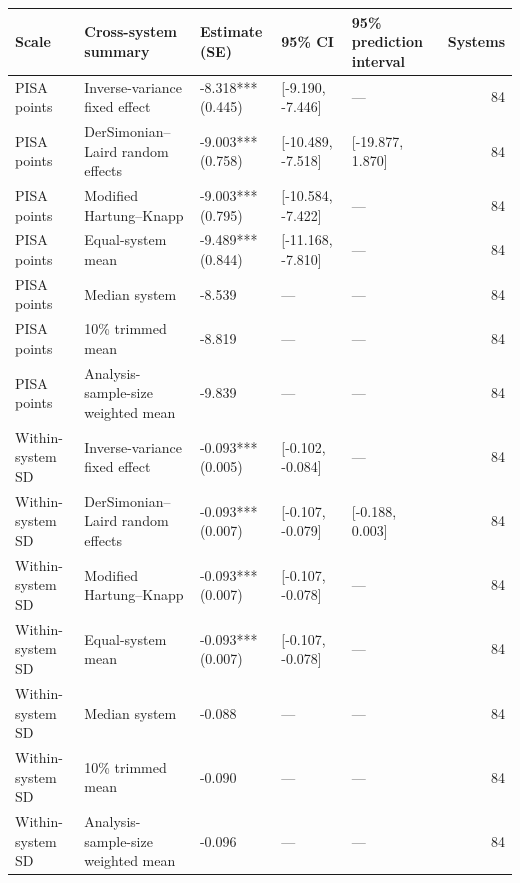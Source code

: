 \begin{tabular}{lllllr}
\toprule
Scale & Cross-system summary & Estimate (SE) & 95\% CI & 95\% prediction interval & Systems \\
\midrule
PISA points & Inverse-variance fixed effect & -8.318*** (0.445) & [-9.190, -7.446] & — & 84 \\
PISA points & DerSimonian–Laird random effects & -9.003*** (0.758) & [-10.489, -7.518] & [-19.877, 1.870] & 84 \\
PISA points & Modified Hartung–Knapp & -9.003*** (0.795) & [-10.584, -7.422] & — & 84 \\
PISA points & Equal-system mean & -9.489*** (0.844) & [-11.168, -7.810] & — & 84 \\
PISA points & Median system & -8.539 & — & — & 84 \\
PISA points & 10\% trimmed mean & -8.819 & — & — & 84 \\
PISA points & Analysis-sample-size weighted mean & -9.839 & — & — & 84 \\
Within-system SD & Inverse-variance fixed effect & -0.093*** (0.005) & [-0.102, -0.084] & — & 84 \\
Within-system SD & DerSimonian–Laird random effects & -0.093*** (0.007) & [-0.107, -0.079] & [-0.188, 0.003] & 84 \\
Within-system SD & Modified Hartung–Knapp & -0.093*** (0.007) & [-0.107, -0.078] & — & 84 \\
Within-system SD & Equal-system mean & -0.093*** (0.007) & [-0.107, -0.078] & — & 84 \\
Within-system SD & Median system & -0.088 & — & — & 84 \\
Within-system SD & 10\% trimmed mean & -0.090 & — & — & 84 \\
Within-system SD & Analysis-sample-size weighted mean & -0.096 & — & — & 84 \\
\bottomrule
\end{tabular}

